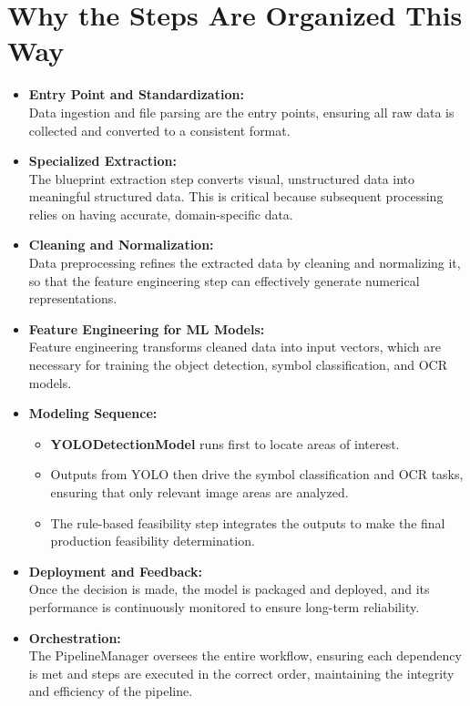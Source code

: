 \documentclass{article}
\begin{document}
\section{Why the Steps Are Organized This Way}
\begin{itemize}
    \item \textbf{Entry Point and Standardization:} \\
    Data ingestion and file parsing are the entry points, ensuring all raw data is collected and converted to a consistent format.
    
    \item \textbf{Specialized Extraction:} \\
    The blueprint extraction step converts visual, unstructured data into meaningful structured data. This is critical because subsequent processing relies on having accurate, domain-specific data.
    
    \item \textbf{Cleaning and Normalization:} \\
    Data preprocessing refines the extracted data by cleaning and normalizing it, so that the feature engineering step can effectively generate numerical representations.
    
    \item \textbf{Feature Engineering for ML Models:} \\
    Feature engineering transforms cleaned data into input vectors, which are necessary for training the object detection, symbol classification, and OCR models.
    
    \item \textbf{Modeling Sequence:} \\
    \begin{itemize}[label={--}]
      \item \textbf{YOLODetectionModel} runs first to locate areas of interest.
      \item Outputs from YOLO then drive the symbol classification and OCR tasks, ensuring that only relevant image areas are analyzed.
      \item The rule-based feasibility step integrates the outputs to make the final production feasibility determination.
    \end{itemize}
    
    \item \textbf{Deployment and Feedback:} \\
    Once the decision is made, the model is packaged and deployed, and its performance is continuously monitored to ensure long-term reliability.
    
    \item \textbf{Orchestration:} \\
    The PipelineManager oversees the entire workflow, ensuring each dependency is met and steps are executed in the correct order, maintaining the integrity and efficiency of the pipeline.
\end{itemize}
\end{document}
